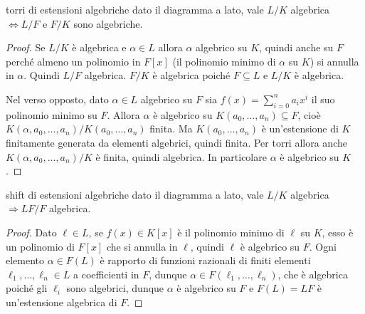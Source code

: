\begin{minipage}{0.9\textwidth}  
\begin{theorem}{torri di estensioni algebriche}
    dato il diagramma a lato, vale $L/K$ algebrica $\iff L/F$ e $F/K$ sono algebriche.
\end{theorem}
\end{minipage}\hfill
\begin{minipage}{0.1\textwidth}  
\end{minipage}\hfill
\begin{proof}
    Se $L/K$ è algebrica e $\alpha \in L$ allora $\alpha$ algebrico su $K$, quindi anche su $F$ perché almeno un polinomio in $F[x]$ (il polinomio minimo di $\alpha$ su $K$) si annulla in $\alpha$. Quindi $L/F$ algebrica. $F/K$ è algebrica poiché $F \subseteq L$ e $L/K$ è algebrica.
    
    Nel verso opposto, dato $\alpha \in L$ algebrico su $F$ sia $f(x) = \sum_{i=0}^n a_ix^i$ il suo polinomio minimo su $F$. Allora $\alpha$ è algebrico su $K(a_0,\dots, a_n) \subseteq F$, cioè $K(\alpha, a_0, \dots, a_n)/K(a_0, \dots, a_n)$ finita. Ma $K(a_0,\dots, a_n)$ è un'estensione di $K$ finitamente generata da elementi algebrici, quindi finita. Per torri allora anche $K(\alpha, a_0, \dots, a_n)/K$ è finita, quindi algebrica. In particolare $\alpha$ è algebrico su $K$.
\end{proof}
\begin{minipage}{0.7\textwidth}
\begin{theorem}{shift di estensioni algebriche}
    dato il diagramma a lato, vale $L/K$ algebrica $\Rightarrow LF/F$ algebrica.
\end{theorem}
\begin{proof}
    Dato $\ell \in L$, se $f(x) \in K[x]$ è il polinomio minimo di $\ell$ su $K$, esso è un polinomio di $F[x]$ che si annulla in $\ell$, quindi $\ell$ è algebrico su $F$. Ogni elemento $\alpha \in F(L)$ è rapporto di funzioni razionali di finiti elementi $\ell_1, \dots, \ell_n \in L$ a coefficienti in $F$, dunque $\alpha \in F(\ell_1, \dots, \ell_n)$, che è algebrica poiché gli $\ell_i$ sono algebrici, dunque $\alpha$ è algebrico su $F$ e $F(L) = LF$ è un'estensione algebrica di $F$.
\end{proof}
\end{minipage}\hfill
\begin{minipage}{0.3\textwidth}  
\end{minipage}\hfill

